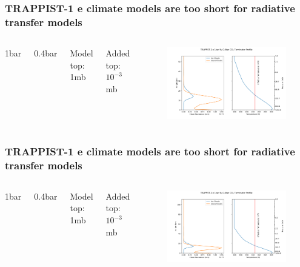 \documentclass{beamer}
\begin{document}
\begin{frame}
    \frametitle{TRAPPIST-1 e climate models are too short for radiative transfer models}
    \begin{columns}
        {\small 1bar 
        
        0.4bar 
        
        Model top: 1mb

        Added top: $10^{-3}$mb}
        \begin{figure}
            \includegraphics[width=\textwidth]{models/atmosphere_profile.png}
        \end{figure}
    \end{columns}
\end{frame}

\begin{frame}
    \frametitle{TRAPPIST-1 e climate models are too short for radiative transfer models}
    \begin{columns}
        {\small 1bar 
        
        0.4bar 
        
        Model top: 1mb

        Added top: $10^{-3}$mb}
        \begin{figure}
            \includegraphics[width=\textwidth]{models/atmosphere_profile_tall.png}
        \end{figure}
    \end{columns}
\end{frame}
\end{document}
